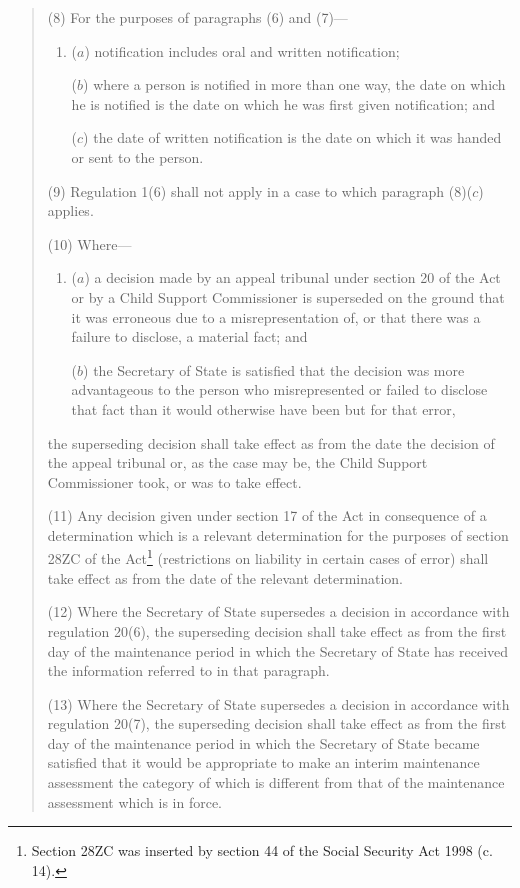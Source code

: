 \documentclass[12pt,a4paper]{article}
\begin{document}
\begin{quotation}
(8) For the purposes of paragraphs (6) and (7)---
\begin{enumerate}\item[]
($a$) notification includes oral and written notification;

($b$) where a person is notified in more than one way, the date on which he is notified is the date on which he was first given notification; and

($c$) the date of written notification is the date on which it was handed or sent to the person.
\end{enumerate}

(9) Regulation 1(6) shall not apply in a case to which paragraph (8)($c$) applies.

(10) Where---
\begin{enumerate}\item[]
($a$) a decision made by an appeal tribunal under section 20 of the Act or by a Child Support Commissioner is superseded on the ground that it was erroneous due to a misrepresentation of, or that there was a failure to disclose, a material fact; and

($b$) the Secretary of State is satisfied that the decision was more advantageous to the person who misrepresented or failed to disclose that fact than it would otherwise have been but for that error,
\end{enumerate}
the superseding decision shall take effect as from the date the decision of the appeal tribunal or, as the case may be, the Child Support Commissioner took, or was to take effect.

(11) Any decision given under section 17 of the Act in consequence of a determination which is a relevant determination for the purposes of section 28ZC of the Act\footnote{\frenchspacing Section 28ZC was inserted by section 44 of the Social Security Act 1998 (c. 14).} (restrictions on liability in certain cases of error) shall take effect as from the date of the relevant determination.

(12) Where the Secretary of State supersedes a decision in accordance with regulation 20(6), the superseding decision shall take effect as from the first day of the maintenance period in which the Secretary of State has received the information referred to in that paragraph.

(13) Where the Secretary of State supersedes a decision in accordance with regulation 20(7), the superseding decision shall take effect as from the first day of the maintenance period in which the Secretary of State became satisfied that it would be appropriate to make an interim maintenance assessment the category of which is different from that of the maintenance assessment which is in force.


\end{quotation}
\end{document}
